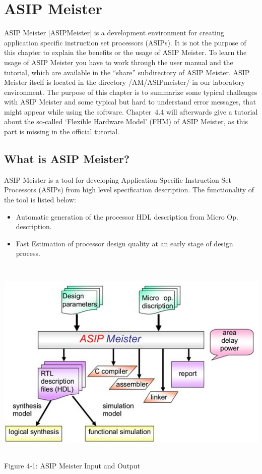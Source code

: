 \documentclass[
]{article}
\author{}
\date{}
\begin{document}
\hypertarget{asip-meister}{%
\section{ASIP Meister}\label{asip-meister}}

ASIP Meister {[}ASIPMeister{]} is a development environment for creating
application specific instruction set processors (ASIPs). It is not the
purpose of this chapter to explain the benefits or the usage of ASIP
Meister. To learn the usage of ASIP Meister you have to work through the
user manual and the tutorial, which are available in the ``share''
subdirectory of ASIP Meister. ASIP Meister itself is located in the
directory /AM/ASIPmeister/ in our laboratory environment. The purpose of
this chapter is to summarize some typical challenges with ASIP Meister
and some typical but hard to understand error messages, that might
appear while using the software. Chapter~4.4 will afterwards give a
tutorial about the so-called `Flexible Hardware Model' (FHM) of ASIP
Meister, as this part is missing in the official tutorial.

\hypertarget{what-is-asip-meister}{%
\subsection{What is ASIP Meister?}\label{what-is-asip-meister}}

ASIP Meister is a tool for developing Application Specific Instruction
Set Processors (ASIPs) from high level specification description. The
functionality of the tool is listed below:

\begin{itemize}
\item
  Automatic generation of the processor HDL description from Micro Op.
  description.
\item
  Fast Estimation of processor design quality at an early stage of
  design process.
\end{itemize}

\includegraphics[width=6.09196in,height=3.97917in]{4-1.png}
Figure 4‑1: ASIP Meister Input and Output
\end{document}
